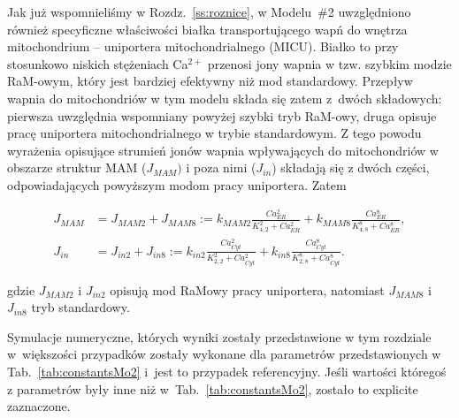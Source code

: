 Jak już wspomnieliśmy w Rozdz.~\ref{ss:roznice}, w Modelu~\#2  uwzględniono również specyficzne właściwości białka transportującego wapń do wnętrza mitochondrium – uniportera mitochondrialnego (MICU). Białko to przy stosunkowo niskich stężeniach Ca$^{2+}$ przenosi jony wapnia w tzw. szybkim modzie RaM-owym, który jest bardziej efektywny niż mod standardowy. Przepływ wapnia do mitochondriów w tym modelu składa się zatem z~dwóch składowych: pierwsza uwzględnia wspomniany powyżej szybki tryb RaM-owy, druga opisuje pracę uniportera mitochondrialnego w trybie standardowym. Z tego powodu wyrażenia opisujące strumień jonów wapnia wpływających do mitochondriów w obszarze struktur MAM ($J_{MAM})$ i poza nimi ($J_{in}$) składają się z dwóch części, odpowiadających powyższym modom pracy uniportera. Zatem

\begin{align*}
	J_{MAM} &= J_{MAM2} + J_{MAM8} := k_{MAM2} \frac{Ca_{ER}^2}{K_{4,2}^2 + Ca_{ER}^2}%
	+ k_{MAM8} \frac{Ca_{ER}^8}{K_{4,8}^8 + Ca_{ER}^8},\\
J_{in} &= J_{in2} + J_{in8}:=k_{in2}\frac{Ca_{Cyt}^2}{K_{2,2}^2+Ca_{Cyt}^2} 
				+ k_{in8}\frac{Ca_{Cyt}^8}{K_{2,8}^8+Ca_{Cyt}^8}.
\end{align*}

\noindent gdzie $J_{MAM2}$ i $J_{in2}$ opisują mod RaMowy pracy uniportera, natomiast $J_{MAM8}$ i $J_{in8}$ tryb standardowy.



Symulacje numeryczne, których wyniki zostały przedstawione w tym rozdziale w~większości przypadków zostały wykonane dla parametrów przedstawionych w Tab.~\ref{tab:constantsMo2} i~jest to przypadek referencyjny. Jeśli wartości któregoś z parametrów były inne niż w~Tab.~\ref{tab:constantsMo2}, zostało to explicite zaznaczone.

